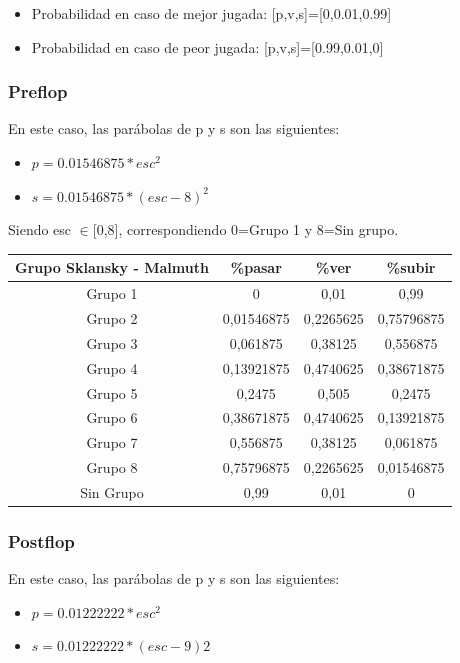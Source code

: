 \begin{itemize}
\item Probabilidad en caso de mejor jugada: [p,v,s]=[0,0.01,0.99] 
\item Probabilidad en caso de peor jugada: [p,v,s]=[0.99,0.01,0]
\end{itemize}

\subsubsection{Preflop}

En este caso, las parábolas de p y s son las siguientes:
\begin{itemize}
\item $p=0.01546875*esc^2 $
\item $s=0.01546875*(esc-8)^2$
\end{itemize}

Siendo esc $\in$[0,8], correspondiendo 0=Grupo 1 y 8=Sin grupo.

\begin{longtable}[c]{|c|c|c|c|}
\hline
\rowcolor{lightgray}Grupo Sklansky - Malmuth & \%pasar & \%ver & \%subir \\ \hline
Grupo 1 & 0 & 0,01 & 0,99 \\ \hline
Grupo 2 & 0,01546875 & 0,2265625 & 0,75796875 \\ \hline
Grupo 3 & 0,061875 & 0,38125 & 0,556875 \\ \hline
Grupo 4 & 0,13921875 & 0,4740625 & 0,38671875 \\ \hline
Grupo 5 & 0,2475 & 0,505 & 0,2475 \\ \hline
Grupo 6 & 0,38671875 & 0,4740625 & 0,13921875 \\ \hline
Grupo 7 & 0,556875 & 0,38125 & 0,061875 \\ \hline
Grupo 8 & 0,75796875 & 0,2265625 & 0,01546875 \\ \hline
Sin Grupo & 0,99 & 0,01 & 0 \\ \hline
\end{longtable}
\subsubsection{Postflop}

En este caso, las parábolas de p y s son las siguientes:
\begin{itemize}
\item $p=0.01222222*esc^2 $
\item $s=0.01222222*(esc-9)2$
\end{itemize}

